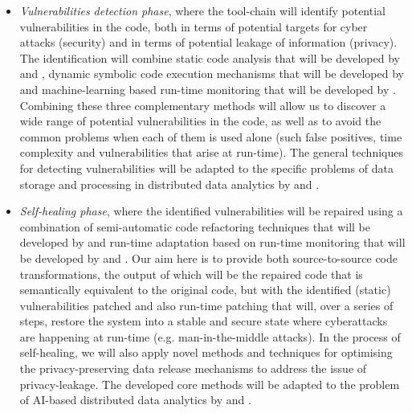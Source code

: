 \documentclass[a4paper,11pt]{article}
\begin{document}
\begin{itemize}
\item \emph{Vulnerabilities detection phase}, where the tool-chain will identify potential vulnerabilities in the code, both in terms of potential targets for cyber attacks (security) and in terms of potential leakage of information (privacy). The identification will combine static code analysis that will be developed by \YAGshort{} and \UCMshort{}, dynamic symbolic code execution mechanisms that will be developed by \IBMshort{} and machine-learning based run-time monitoring that will be developed by \SCCHshort{}. Combining these three complementary methods will allow us to discover a wide range of potential vulnerabilities in the code, as well as to avoid the common problems when each of them is used alone (such false positives, time complexity and vulnerabilities that arise at run-time). The general techniques for detecting vulnerabilities will be adapted to the specific problems of data storage and processing in distributed data analytics by \UODshort{} and \SCCHshort{}. 

\item \emph{Self-healing phase}, where the identified vulnerabilities will be repaired using a combination of semi-automatic code refactoring techniques that will be developed by \SAshort{} and run-time adaptation based on run-time monitoring that will be developed by \DEMshort{} and \SCCHshort{}. Our aim here is to provide both source-to-source code transformations, the output of which will be the repaired code that is semantically equivalent to the original code, but with the identified (static) vulnerabilities patched and also run-time patching that will, over a series of steps, restore the system into a stable and secure state where cyberattacks are happening at run-time (e.g. man-in-the-middle attacks). In the process of self-healing, we will also apply novel methods and techniques for optimising the privacy-preserving data release mechanisms to address the issue of privacy-leakage. The developed core methods will be adapted to the problem of AI-based distributed data analytics by \DEMshort{} and \UODshort{}. 


\end{itemize}
\end{document}

